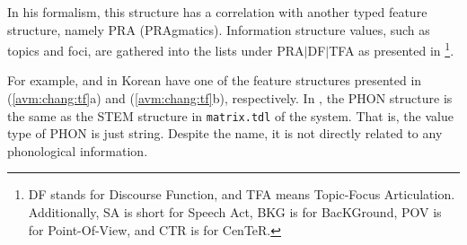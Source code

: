 \noindent In his formalism, this structure has a correlation with
another typed feature structure, namely PRA (PRAgmatics). Information
structure values, such as topics and foci, are gathered into the lists
under PRA{$\mid$}DF{$\mid$}TFA as presented in
\footnote{DF stands for Discourse Function, and
  TFA means Topic-Focus Articulation. Additionally, SA is short for
  Speech Act, BKG is for BacKGround, POV is for Point-Of-View, and CTR
  is for CenTeR.}.


\newpage 
\noindent For example, \nun and \ika in Korean have one of the feature
structures presented in (\ref{avm:chang:tf}a) and
(\ref{avm:chang:tf}b), respectively.  In , the
PHON structure is the same as the STEM structure in
\texttt{matrix.tdl} of the \lingo {} system. That is, the
value type of PHON is just string. Despite the name, it is not
directly related to any 
phonological information.


